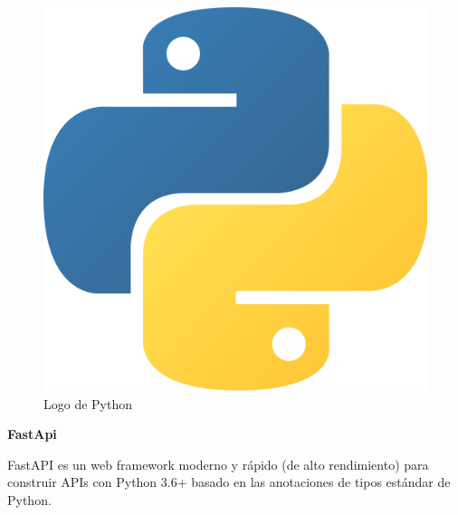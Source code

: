 \begin{figure}[!htb]
    \centering
    \includegraphics[scale=0.1]{TT/img/analisis/pythonlogo.png}
    \caption{Logo de Python}
    \label{graphic:PythonLogo}    
\end{figure}

\textbf{FastApi}

FastAPI es un web framework moderno y rápido (de alto rendimiento) para construir APIs con Python 3.6+ basado en las anotaciones de tipos estándar de Python.

